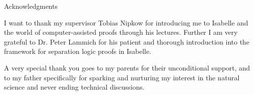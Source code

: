 \thispagestyle{empty}

\vspace*{20mm}

\begin{center}
{ Acknowledgments}
\end{center}

\vspace{10mm}
I want to thank my supervisor Tobias Nipkow for introducing me to
Isabelle and the world of computer-assisted proofs through his lectures.
Further I am very grateful to Dr. Peter Lammich for his patient
and thorough introduction into the framework for separation logic proofs in Isabelle.

A very special thank you goes to my parents for their unconditional support,
and to my father specifically
for sparking and nurturing my interest in the natural science
and never ending technical discussions.


\cleardoublepage{}
